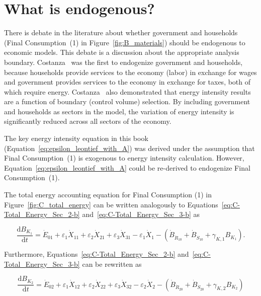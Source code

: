 \section{What is endogenous?}
\label{sec:what_is_endogenous}

There is debate in the literature about whether government
and households
(Final Consumption~(1) in Figure~\ref{fig:B_materials}) 
should be endogenous to economic models.
This debate is a discussion about the appropriate analysis boundary.
Costanza~\cite{Costanza:1980ww} was the first to endogenize government and households, 
because households provide services to the economy (labor) in exchange for wages 
and government provides services to the economy in exchange for taxes, 
both of which require energy. 
Costanza~\cite{Costanza:1980ww} also demonstrated that 
energy intensity results
are a function of boundary (control volume) selection. 
By including government and households 
as sectors in the model, 
the variation of energy intensity is significantly reduced 
across all sectors of the economy. 

The key energy intensity equation in this book
(Equation~\ref{eq:epsilon_leontief_with_A})
was derived under the assumption that Final Consumption~(1)
is exogenous to energy intensity calculation.
However, Equation~\ref{eq:epsilon_leontief_with_A}
could be re-derived to endogenize 
Final Consumption~(1).

The total energy accounting equation for Final Consumption (1)
in Figure~\ref{fig:C_total_energy} can be written 
analogously to Equations~\ref{eq:C-Total_Energy_Sec_2-b}
and~\ref{eq:C-Total_Energy_Sec_3-b} as

\begin{equation} \label{eq:C-Total_Energy_Sec_1-unfinished}
	\frac{\mathrm{d}B_{K_{1}}}{\mathrm{d}t}
	= \dot{E}_{01}
	+ \varepsilon_{1} \dot{X}_{11}
	+ \varepsilon_{2} \dot{X}_{21}
	+ \varepsilon_{3} \dot{X}_{31}
	- \varepsilon_{1} \dot{X}_{1}
	- \left( \dot{B}_{\dot{R}_{10}} 
							+ \dot{B}_{\dot{S}_{10}}
							+ \gamma_{K,1} B_{K_{1}}
							\right).
\end{equation}

\noindent{}Furthermore, Equations~\ref{eq:C-Total_Energy_Sec_2-b}
and~\ref{eq:C-Total_Energy_Sec_3-b}
can be rewritten as 

\begin{equation} \label{eq:C-Total_Energy_Sec_2-unfinished}
	\frac{\mathrm{d}B_{K_{2}}}{\mathrm{d}t}
	= \dot{E}_{02}
	+ \varepsilon_{1} \dot{X}_{12}
	+ \varepsilon_{2} \dot{X}_{22}
	+ \varepsilon_{3} \dot{X}_{32}
	- \varepsilon_{2} \dot{X}_{2}
	- \left( \dot{B}_{\dot{R}_{20}} 
							+ \dot{B}_{\dot{S}_{20}}
							+ \gamma_{K,2} B_{K_{2}}
							\right)
\end{equation}

